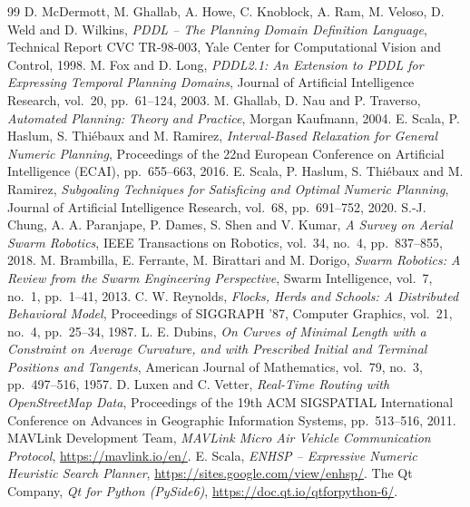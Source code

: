 \documentclass[11pt,a4paper,oneside]{report}
\begin{document}
\clearpage
{}
{}
\renewcommand{\bibname}{References}
\begin{thebibliography}{99}
\setlength{\itemsep}{3pt}
 D. McDermott, M. Ghallab, A. Howe, C. Knoblock, A. Ram, M. Veloso,
  D. Weld and D. Wilkins, \emph{PDDL -- The Planning Domain Definition Language}, Technical Report
  CVC TR-98-003, Yale Center for Computational Vision and Control, 1998.
 M. Fox and D. Long, \emph{PDDL2.1: An Extension to PDDL for Expressing
  Temporal Planning Domains}, Journal of Artificial Intelligence Research, vol.~20, pp.~61--124,
  2003.
 M. Ghallab, D. Nau and P. Traverso, \emph{Automated Planning:
  Theory and Practice}, Morgan Kaufmann, 2004.
 E. Scala, P. Haslum, S. Thi\'ebaux and M. Ramirez,
  \emph{Interval-Based Relaxation for General Numeric Planning}, Proceedings of the 22nd European
  Conference on Artificial Intelligence (ECAI), pp.~655--663, 2016.
 E. Scala, P. Haslum, S. Thi\'ebaux and M. Ramirez,
  \emph{Subgoaling Techniques for Satisficing and Optimal Numeric Planning}, Journal of Artificial
  Intelligence Research, vol.~68, pp.~691--752, 2020.
 S.-J. Chung, A. A. Paranjape, P. Dames, S. Shen and V. Kumar,
  \emph{A Survey on Aerial Swarm Robotics}, IEEE Transactions on Robotics, vol.~34, no.~4,
  pp.~837--855, 2018.
 M. Brambilla, E. Ferrante, M. Birattari and M. Dorigo,
  \emph{Swarm Robotics: A Review from the Swarm Engineering Perspective}, Swarm Intelligence,
  vol.~7, no.~1, pp.~1--41, 2013.
 C. W. Reynolds, \emph{Flocks, Herds and Schools: A Distributed
  Behavioral Model}, Proceedings of SIGGRAPH '87, Computer Graphics, vol.~21, no.~4, pp.~25--34,
  1987.
 L. E. Dubins, \emph{On Curves of Minimal Length with a Constraint on
  Average Curvature, and with Prescribed Initial and Terminal Positions and Tangents}, American
  Journal of Mathematics, vol.~79, no.~3, pp.~497--516, 1957.
 D. Luxen and C. Vetter, \emph{Real-Time Routing with OpenStreetMap Data},
  Proceedings of the 19th ACM SIGSPATIAL International Conference on Advances in Geographic
  Information Systems, pp.~513--516, 2011.
 MAVLink Development Team, \emph{MAVLink Micro Air Vehicle Communication
  Protocol}, \url{https://mavlink.io/en/}.
 E. Scala, \emph{ENHSP -- Expressive Numeric Heuristic Search Planner},
  \url{https://sites.google.com/view/enhsp/}.
 The Qt Company, \emph{Qt for Python (PySide6)},
  \url{https://doc.qt.io/qtforpython-6/}.
\end{thebibliography}
\end{document}
